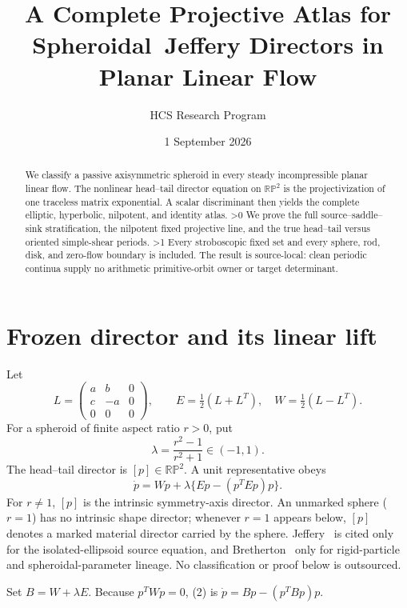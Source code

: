 \documentclass[10pt]{article}
\title{A Complete Projective Atlas for Spheroidal\
Jeffery Directors in Planar Linear Flow}
\author{HCS Research Program}
\date{1 September 2026}
\providecommand{\CRevisionRound}{2}
\newcommand{\RP}{\mathbb{RP}}
\begin{document}
\maketitle

\begin{abstract}
We classify a passive axisymmetric spheroid in every steady incompressible
planar linear flow.  The nonlinear head--tail director equation on $\RP^2$ is
the projectivization of one traceless matrix exponential.  A scalar
discriminant then yields the complete elliptic, hyperbolic, nilpotent, and
identity atlas.
\ifnum\CRevisionRound>0
We prove the full source--saddle--sink stratification, the nilpotent fixed
projective line, and the true head--tail versus oriented simple-shear periods.
\fi
\ifnum\CRevisionRound>1
Every stroboscopic fixed set and every sphere, rod, disk, and zero-flow boundary
is included.
\fi
The result is source-local: clean periodic continua supply no arithmetic
primitive-orbit owner or target determinant.
\end{abstract}

\section{Frozen director and its linear lift}
Let
\[
 L=\begin{pmatrix}a&b&0\\c&-a&0\\0&0&0\end{pmatrix},\qquad
 E=\tfrac12(L+L^{T}),\quad W=\tfrac12(L-L^{T}).
\]
For a spheroid of finite aspect ratio $r>0$, put
\begin{equation}
 \lambda=\frac{r^2-1}{r^2+1}\in(-1,1). \tag{1}
\end{equation}
The head--tail director is $[p]\in\RP^2$.  A unit representative obeys
\begin{equation}
 \dot p=Wp+\lambda\{Ep-(p^TEp)p\}. \tag{2}
\end{equation}
For $r\ne1$, $[p]$ is the intrinsic symmetry-axis director.  An unmarked
sphere ($r=1$) has no intrinsic shape director; whenever $r=1$ appears below,
$[p]$ denotes a marked material director carried by the sphere.
Jeffery~\cite{Jeffery1922} is cited only for the isolated-ellipsoid source
equation, and Bretherton~\cite{Bretherton1962} only for rigid-particle and
spheroidal-parameter lineage.  No classification or proof below is outsourced.

Set $B=W+\lambda E$.  Because $p^TWp=0$, (2) is
$\dot p=Bp-(p^TBp)p$.
\end{document}
